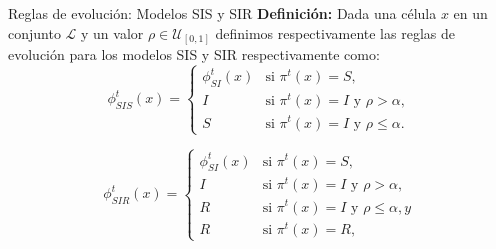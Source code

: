 \documentclass[9pt]{beamer}
\begin{document}
\begin{frame}{Reglas de evolución: Modelos SIS y SIR}
\textbf{Definición:} Dada una célula $x$ en un conjunto $\mathcal{L}$ y un valor $\rho\in\mathcal{U}_{[0,1]}$ definimos respectivamente las reglas de evolución para los modelos SIS y SIR respectivamente como:
\begin{equation}
    \phi_{SIS}^t(x)=\left\{\begin{array}{ll}
        \phi_{SI}^t(x) & \text{si }\pi^t(x) = S,\\
        I & \text{si }\pi^t(x)=I\text{ y }\rho>\alpha,\\
        S & \text{si }\pi^t(x)=I\text{ y }\rho\leq\alpha.
    \end{array}\right.
\end{equation}

\begin{equation}
    \phi_{SIR}^t(x)=\left\{\begin{array}{ll}
        \phi_{SI}^t(x) & \text{si }\pi^t(x) = S,\\
        I & \text{si }\pi^t(x)=I\text{ y }\rho>\alpha,\\
        R & \text{si }\pi^t(x)=I\text{ y }\rho\leq\alpha, y \\
        R & \text{si }\pi^t(x)=R,
    \end{array}\right.
\end{equation}
\end{frame}
\end{document}
